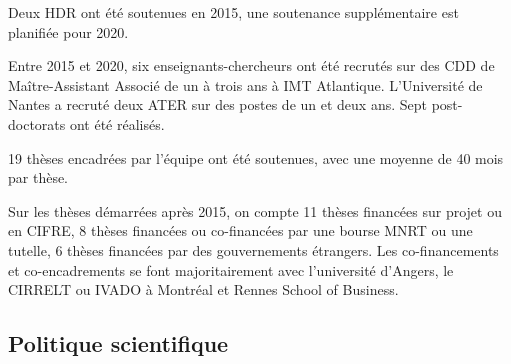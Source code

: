Deux HDR ont été soutenues en 2015, une soutenance supplémentaire est planifiée pour 2020.

Entre 2015 et 2020,  six enseignants-chercheurs ont été recrutés sur des CDD de Maître-Assistant Associé de un à trois ans à IMT Atlantique. 
L'Université de Nantes a recruté deux ATER sur des postes de un et deux ans.
Sept post-doctorats ont été réalisés.

19 thèses encadrées par l'équipe ont été soutenues, avec une moyenne de 40 mois par thèse. 


Sur les thèses démarrées après 2015, on compte 11 thèses financées sur projet ou en CIFRE, 8 thèses financées ou co-financées par une bourse MNRT  ou une tutelle,
6 thèses financées par des gouvernements étrangers.
Les co-financements et co-encadrements se font majoritairement avec l'université d'Angers, le CIRRELT ou IVADO à Montréal et Rennes School of Business. 


\subsection{Politique scientifique}
  

